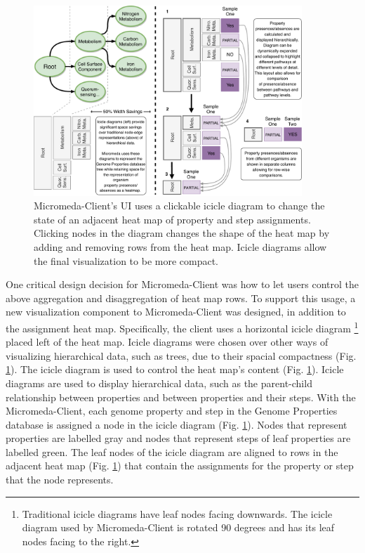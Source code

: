 \begin{figure}[!ht]
  \centering
	\includegraphics[width=0.9\textwidth]{media/visualization_design_philosphy.pdf}
	 \caption{Micromeda-Client's UI uses a clickable icicle diagram to change the state of an adjacent heat map of property and step assignments. Clicking nodes in the diagram changes the shape of the heat map by adding and removing rows from the heat map. Icicle diagrams allow the final visualization to be more compact.}
	 \label{fig:visualization-philosophy}
\end{figure}

One critical design decision for Micromeda-Client was how to let users control the above aggregation and disaggregation of heat map rows. To support this usage, a new visualization component to Micromeda-Client was designed, in addition to the assignment heat map. Specifically, the client uses a horizontal icicle diagram \footnote{Traditional icicle diagrams have leaf nodes facing downwards. The icicle diagram used by Micromeda-Client is rotated 90 degrees and has its leaf nodes facing to the right.} placed left of the heat map. Icicle diagrams were chosen over other ways of visualizing hierarchical data, such as trees, due to their spacial compactness (Fig. \ref{fig:visualization-philosophy}). The icicle diagram is used to control the heat map's content (Fig. \ref{fig:visualization-philosophy}). Icicle diagrams are used to display hierarchical data, such as the parent-child relationship between properties and between properties and their steps. With the Micromeda-Client, each genome property and step in the Genome Properties database is assigned a node in the icicle diagram (Fig. \ref{fig:visualization-philosophy}). Nodes that represent properties are labelled gray and nodes that represent steps of leaf properties are labelled green. The leaf nodes of the icicle diagram are aligned to rows in the adjacent heat map (Fig. \ref{fig:visualization-philosophy}) that contain the assignments for the property or step that the node represents.

